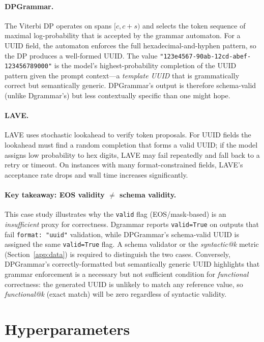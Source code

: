 \paragraph{DPGrammar.}
The Viterbi DP operates on spans $[c, c{+}s)$ and selects the token sequence of maximal log-probability that is accepted by the grammar automaton.
For a UUID field, the automaton enforces the full hexadecimal-and-hyphen pattern, so the DP produces a well-formed UUID.
The value \texttt{"123e4567-90ab-12cd-abef-123456789000"} is the model's highest-probability completion of the UUID pattern given the prompt context---a \emph{template UUID} that is grammatically correct but semantically generic.
DPGrammar's output is therefore schema-valid (unlike Dgrammar's) but less contextually specific than one might hope.

\paragraph{LAVE.}
LAVE uses stochastic lookahead to verify token proposals.
For UUID fields the lookahead must find a random completion that forms a valid UUID; if the model assigns low probability to hex digits, LAVE may fail repeatedly and fall back to a retry or timeout.
On instances with many format-constrained fields, LAVE's acceptance rate drops and wall time increases significantly.

\paragraph{Key takeaway: EOS validity $\neq$ schema validity.}
This case study illustrates why the \texttt{valid} flag (EOS/mask-based) is an \emph{insufficient} proxy for correctness.
Dgrammar reports \texttt{valid=True} on outputs that fail \texttt{format:\,"uuid"} validation, while DPGrammar's schema-valid UUID is assigned the same \texttt{valid=True} flag.
A schema validator or the \emph{syntactic@k} metric (Section~\ref{app:data}) is required to distinguish the two cases.
Conversely, DPGrammar's correctly-formatted but semantically generic UUID highlights that grammar enforcement is a necessary but not sufficient condition for \emph{functional} correctness: the generated UUID is unlikely to match any reference value, so \emph{functional@k} (exact match) will be zero regardless of syntactic validity.

\section{Hyperparameters}
\label{app:hyperparams}

